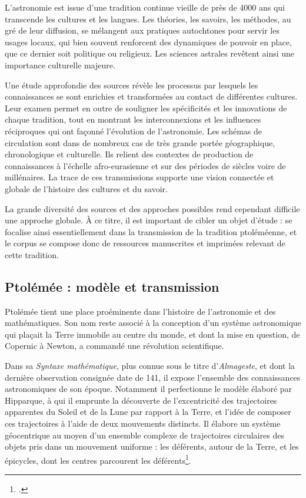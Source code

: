 
L'astronomie est issue d'une tradition continue vieille de près de 4000
ans qui transcende les cultures et les langues. Les théories, les
savoirs, les méthodes, au gré de leur diffusion, se mélangent aux
pratiques autochtones pour servir les usages locaux, qui bien souvent
renforcent des dynamiques de pouvoir en place, que ce dernier soit
politique ou religieux. Les sciences astrales revêtent ainsi une
importance culturelle majeure.

Une étude approfondie des sources révèle les processus par lesquels les
connaissances se sont enrichies et transformées au contact de
différentes cultures. Leur examen permet en outre de souligner les
spécificités et les innovations de chaque tradition, tout en montrant
les interconnexions et les influences réciproques qui ont façonné
l'évolution de l'astronomie. Les schémas de circulation sont dans de
nombreux cas de très grande portée géographique, chronologique et
culturelle. Ils relient des contextes de production de connaissances à
l'échelle afro-eurasienne et sur des périodes de siècles voire de
millénaires. La trace de ces transmissions supporte une vision connectée
et globale de l'histoire des cultures et du savoir.

La grande diversité des sources et des approches possibles rend
cependant difficile une approche globale. À ce titre, il est important
de cibler un objet d'étude : \eida se focalise ainsi essentiellement dans
la transmission de la tradition ptoléméenne, et le corpus se compose
donc de ressources manuscrites et imprimées relevant de cette tradition.

\hypertarget{ptolemee-modele-et-transmission}{%
\subsection{Ptolémée : modèle et
transmission}\label{ptolemee-modele-et-transmission}}

Ptolémée tient une place proéminente dans l'histoire de l'astronomie et
des mathématiques. Son nom reste associé à la conception d'un système
astronomique qui plaçait la Terre immobile au centre du monde, et dont
la mise en question, de Copernic à Newton, a commandé une révolution
scientifique.

Dans sa \emph{Syntaxe mathématique}, plus connue sous le titre
d'\emph{Almageste}, et dont la dernière observation consignée date de
141, il expose l'ensemble des connaissances astronomiques de son époque.
Notamment il perfectionne le modèle élaboré par Hipparque, à qui il
emprunte la découverte de l'excentricité des trajectoires apparentes du
Soleil et de la Lune par rapport à la Terre, et l'idée de composer ces
trajectoires à l'aide de deux mouvements distincts. Il élabore un
système géocentrique au moyen d'un ensemble complexe de trajectoires
circulaires des objets pris dans un mouvement uniforme : les déférents,
autour de la Terre, et les épicycles, dont les centres parcourent les
déférents\footcite{lequeux_systeme_nodate}.

